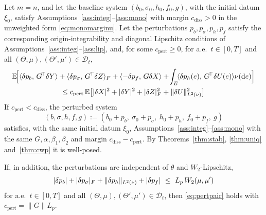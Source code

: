 \begin{corollary}\label{cor:robust}
Let $m=n$, and let the baseline system $(b_0,\sigma_0,h_0,f_0,g)$, with the initial
datum $\xi_0$, satisfy Assumptions~\ref{ass:integ}--\ref{ass:mono} with margin
$c_{\mathrm{diss}}>0$ in the unweighted form \eqref{eq:monomarginu}. Let the perturbations
$p_b,p_\sigma,p_h,p_f$ satisfy the corresponding origin-integrability and diagonal
Lipschitz conditions of Assumptions~\ref{ass:integ}--\ref{ass:lip}, and, for some
$c_{\mathrm{pert}}\ge0$, for a.e.\ $t\in[0,T]$ and all
$(\Theta,\mu),(\Theta',\mu')\in\mathcal D_t$,
\begin{multline}\label{eq:pertpair}
\mathbb{E}\!\Big[\langle \delta p_b,\,G^{\!\top}\delta Y\rangle+\langle \delta p_\sigma,\,G^{\!\top}\delta Z\rangle_F
+\langle -\delta p_f,\,G\delta X\rangle+\!\int_E\!\langle \delta p_h(e),\,G^{\!\top}\delta U(e)\rangle\nu(\mathrm{d} e)\Big]\\
\le c_{\mathrm{pert}}\,\mathbb{E}\big[|\delta X|^2+|\delta Y|^2+|\delta Z|_F^2+\lVert \delta U\rVert_{L^2(\nu)}^2\big]
\end{multline}
If
$c_{\mathrm{pert}}<c_{\mathrm{diss}}$, the perturbed system
\[
(b,\sigma,h,f,g):=(b_0+p_b,\ \sigma_0+p_\sigma,\ h_0+p_h,\ f_0+p_f,\ g)
\]
satisfies, with the same initial datum $\xi_0$, Assumptions~\ref{ass:integ}--\ref{ass:mono}
with the same $G,\alpha,\beta_1,\beta_2$ and margin $c_{\mathrm{diss}}-c_{\mathrm{pert}}$. By
Theorems~\ref{thm:stab}, \ref{thm:uniq} and~\ref{thm:cwp} it is well-posed.

If, in addition, the perturbations are independent of $\theta$ and $W_2$-Lipschitz,
\begin{equation}\label{eq:pertlip}
|\delta p_b|+|\delta p_\sigma|_F+\Lnorm{\delta p_h}+|\delta p_f|\ \le\ L_p\,W_2(\mu,\mu')
\end{equation}
for a.e.\ $t\in[0,T]$ and all $(\Theta,\mu),(\Theta',\mu')\in\mathcal D_t$, then
\eqref{eq:pertpair} holds with
$c_{\mathrm{pert}}=\|G\|L_p$.
\end{corollary}
